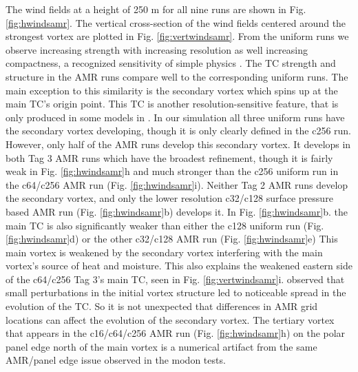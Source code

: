 The wind fields at a height of 250 m for all nine runs are shown in Fig. \ref{fig:hwindsamr}. 
The vertical cross-section of the wind fields centered around the
strongest vortex are plotted in Fig. \ref{fig:vertwindsamr}. From the uniform 
runs we observe increasing strength with increasing resolution
as well increasing compactness, a recognized sensitivity of simple physics 
\citep{reed2012idealized}. The TC strength and structure in the AMR runs compare well to
the corresponding uniform runs.  The main exception to this similarity is
the secondary vortex which spins up at the main TC's origin point. 
This TC is another resolution-sensitive feature, that is only produced in 
some models in \cite{reed2012idealized}.
In our simulation all three uniform runs have the secondary vortex developing, 
though it is only clearly defined in the c256 run. However, only half of the 
AMR runs develop this secondary vortex.
It develops in both Tag 3 AMR runs which have the broadest refinement, 
though it is fairly weak in Fig. \ref{fig:hwindsamr}h and much stronger than 
the c256 uniform run in the c64/c256 AMR run (Fig. \ref{fig:hwindsamr}i). 
Neither Tag 2 AMR runs develop the secondary vortex, and only the lower resolution 
c32/c128 surface pressure based AMR run (Fig. \ref{fig:hwindsamr}b) develops 
it. In Fig. \ref{fig:hwindsamr}b. the main TC is also significantly 
weaker than either the c128 uniform run (Fig. \ref{fig:hwindsamr}d) or the other 
c32/c128 AMR run (Fig. \ref{fig:hwindsamr}e) This main vortex is weakened by the
secondary vortex interfering with the main 
vortex's source of heat and moisture. This also explains the weakened eastern side of the
c64/c256 Tag 3's main TC, seen in Fig. \ref{fig:vertwindsamr}i. 
\cite{reed2012idealized} observed that small perturbations in the initial vortex structure 
led to noticeable spread in the evolution of the TC. So it is not
unexpected that differences in AMR grid locations can affect the evolution of the secondary vortex.
The tertiary vortex that appears in
the c16/c64/c256 AMR run (Fig. \ref{fig:hwindsamr}h) on the polar panel edge north of the main vortex
is a numerical artifact from the same AMR/panel edge issue observed in the modon tests.

